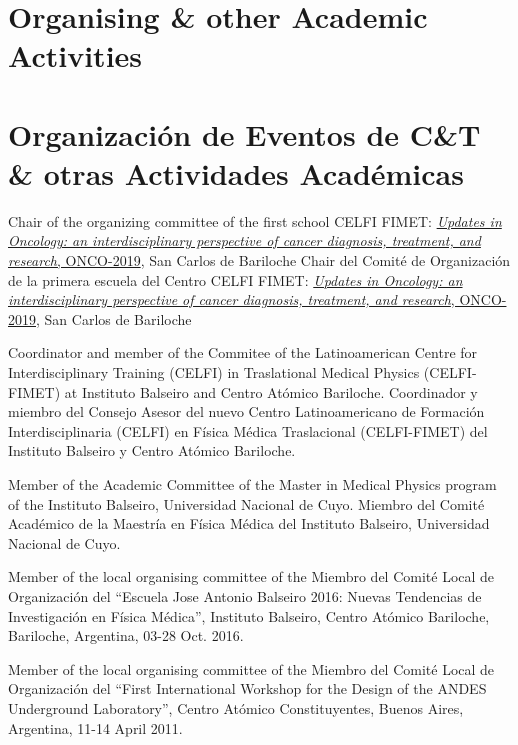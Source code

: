 \ifeng
\section*{Organising \& other Academic Activities}
\else
\section*{Organización de Eventos de C\&T \& otras Actividades Académicas}
\fi

\ifeng
Chair of the organizing committee of the first school CELFI FIMET: \href{https://fisica.cab.cnea.gov.ar/fisicamedica/celfi-oncology/}{{\emph{Updates in Oncology: an interdisciplinary perspective of cancer diagnosis, treatment, and research}}, ONCO-2019}, San Carlos de Bariloche
\else
Chair del Comité de Organización de la primera escuela del Centro CELFI FIMET: \href{https://fisica.cab.cnea.gov.ar/fisicamedica/celfi-oncology/}{{\emph{Updates in Oncology: an interdisciplinary perspective of cancer diagnosis, treatment, and research}}, ONCO-2019}, San Carlos de Bariloche
\fi

\ifeng
Coordinator and member of the Commitee of the Latinoamerican Centre for Interdisciplinary Training (CELFI) in Traslational Medical Physics (CELFI-FIMET) at Instituto Balseiro and Centro Atómico Bariloche.  
\else
Coordinador y miembro del Consejo Asesor del nuevo Centro Latinoamericano de Formación Interdisciplinaria (CELFI) en Física Médica Traslacional (CELFI-FIMET) del Instituto Balseiro y Centro Atómico Bariloche.
\fi

\ifeng
Member of the Academic Committee of the Master in Medical Physics program of the Instituto Balseiro, Universidad Nacional de Cuyo.
\else
Miembro del Comité Académico de la Maestría en Física Médica del Instituto Balseiro, Universidad Nacional de Cuyo.
\fi

\ifeng
Member of the local organising committee of the 
\else
Miembro del Comité Local de Organización del 
\fi
``Escuela Jose Antonio Balseiro 2016: Nuevas Tendencias de Investigación en Física Médica'', Instituto Balseiro, Centro Atómico Bariloche, Bariloche, Argentina, 03-28 Oct. 2016.

\ifeng
Member of the local organising committee of the 
\else
Miembro del Comité Local de Organización del 
\fi
``First International Workshop for the Design of the ANDES Underground Laboratory'', Centro Atómico Constituyentes, Buenos Aires, Argentina, 11-14 April 2011.

